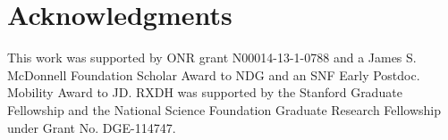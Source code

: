 \documentclass[10pt,letterpaper]{article}
\begin{document}
\section{\bf Acknowledgments}

This work was supported by ONR grant N00014-13-1-0788 and a James S. McDonnell Foundation Scholar Award to NDG and an SNF Early Postdoc. Mobility Award to JD. RXDH was supported by the Stanford Graduate Fellowship and the National Science Foundation Graduate Research Fellowship under Grant No. DGE-114747.

\small




\setlength{\bibleftmargin}{.125in}
\setlength{\bibindent}{-\bibleftmargin}


\end{document}
